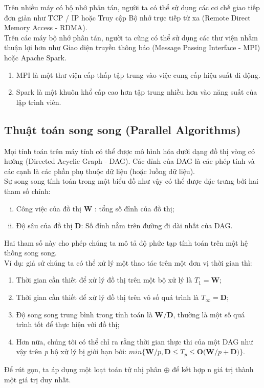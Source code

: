 \documentclass[11pt,a4paper]{article}
\numberwithin{equation}{subsection}
\numberwithin{figure}{subsection}
\numberwithin{table}{subsection}
\begin{document}
Trên nhiều máy có bộ nhớ phân tán, người ta có thể sử dụng các cơ chế giao tiếp đơn giản như TCP / IP hoặc Truy cập Bộ nhớ trực tiếp từ xa (Remote Direct Memory Access - RDMA). \\

Trên các máy bộ nhớ phân tán, người ta cũng có thể sử dụng các thư viện nhằm thuận lợi hơn như Giao diện truyền thông báo (Message Passing Interface - MPI) hoặc Apache Spark.
\begin{enumerate}[-]
	\item  MPI là một thư viện cấp thấp tập trung vào việc cung cấp hiệu suất di động.
	\item Spark là một khuôn khổ cấp cao hơn tập trung nhiều hơn vào năng suất của lập trình viên.
\end{enumerate}

\subsection{Thuật toán song song (Parallel Algorithms)}
Mọi tính toán trên máy tính có thể được mô hình hóa dưới dạng đồ thị vòng có hướng (Directed Acyclic Graph - DAG). Các đỉnh của DAG là các phép tính và các cạnh là các phần phụ thuộc dữ liệu (hoặc luồng dữ liệu).\\
Sự song song tính toán trong một biểu đồ như vậy có thể được đặc trưng bởi hai tham số chính:
\begin{enumerate}[i.]
	\item Công việc của đồ thị \textbf{W	}: tổng số đỉnh của đồ thị;
	\item Độ sâu của đồ thị \textbf{D}: Số đỉnh nằm trên đường đi dài nhất của DAG.
\end{enumerate}
Hai tham số này cho phép chúng ta mô tả độ phức tạp tính toán trên một hệ thống song song.\\
Ví dụ: giả sử chúng ta có thể xử lý một thao tác trên một đơn vị thời gian thì:
\begin{enumerate}[+]
	\item Thời gian cần thiết để xử lý đồ thị trên một bộ xử lý là $T_1 = \textbf{W}$;
	\item Thời gian cần thiết để xử lý đồ thị trên vô số quá trình là $T_\infty = \textbf{D}$;
	\item Độ song song trung bình trong tính toán là $\textbf{W/D}$, thường là một số quá trình tốt để thực hiện với đồ thị;
	\item Hơn nữa, chúng tôi có thể chỉ ra rằng thời gian thực thi của một DAG như vậy trên \textit{p} bộ xử lý bị giới hạn bởi: $min\{\textbf{W}/p,\textbf{D} \leqslant T_p \leqslant \textbf{O(W}/p+\textbf{D)}\} $.
\end{enumerate}
Để rút gọn, ta áp dụng một loạt toán tử nhị phân $\oplus$ để kết hợp n giá trị thành một giá trị duy nhất.
\end{document}

